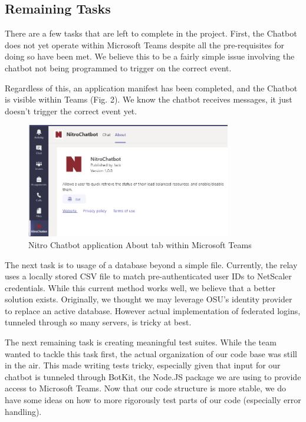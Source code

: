 \documentclass[onecolumn, draftclsnofoot,10pt, compsoc]{IEEEtran}
\begin{document}
\subsection{Remaining Tasks}
There are a few tasks that are left to complete in the project.
First, the Chatbot does not yet operate within Microsoft Teams despite all the pre-requisites for doing so have been met.
We believe this to be a fairly simple issue involving the chatbot not being programmed to trigger on the correct event.

Regardless of this, an application manifest has been completed, and the Chatbot is visible within Teams (Fig. 2).
We know the chatbot receives messages, it just doesn't trigger the correct event yet.

\begin{figure}[h]
    \centering
    \captionsetup{format=hang,justification=raggedright,margin=2cm}
    \includegraphics[height=5cm]{teamsapp.PNG}
    \caption[App within Teams]{Nitro Chatbot application About tab within Microsoft Teams}
    \label{fig:Teams App About Page}
\end{figure}

The next task is to usage of a database beyond a simple file.
Currently, the relay uses a locally stored CSV file to match pre-authenticated user IDs to NetScaler credentials.
While this current method works well, we believe that a better solution exists.
Originally, we thought we may leverage OSU's identity provider to replace an active database.
However actual implementation of federated logins, tunneled through so many servers, is tricky at best.

The next remaining task is creating meaningful test suites.
While the team wanted to tackle this task first, the actual organization of our code base was still in the air.
This made writing tests tricky, especially given that input for our chatbot is tunneled through BotKit, the Node.JS package we are using to provide access to Microsoft Teams.
Now that our code structure is more stable, we do have some ideas on how to more rigorously test parts of our code (especially error handling).
\end{document}
